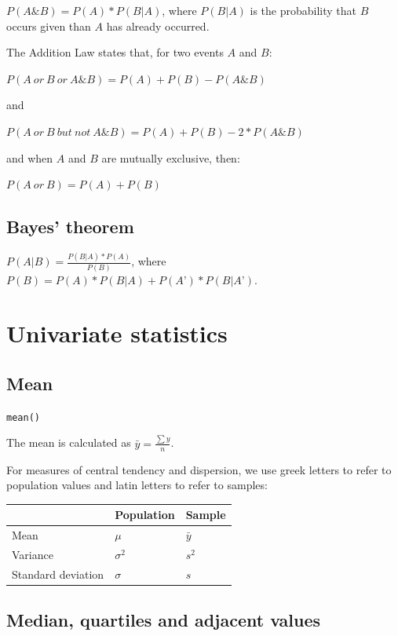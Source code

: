 \documentclass[
  11pt,
  a4paper,
]{book}
\begin{document}
\(P(A \& B) = P(A) * P(B|A)\), where \(P(B|A)\) is the probability that \(B\) occurs given than \(A\) has already occurred.

The Addition Law states that, for two events \(A\) and \(B\):

\(P(A\ or\ B\ or\ A\&B) = P(A) + P(B) - P(A\&B)\)

and

\(P(A\ or\ B\ but\ not\ A\&B) = P(A) + P(B) - 2*P(A\&B)\)

and when \(A\) and \(B\) are mutually exclusive, then:

\(P(A\ or\ B) = P(A) + P(B)\)

\hypertarget{bayes-theorem}{%
\subsection{Bayes' theorem}\label{bayes-theorem}}

\(P(A|B)= \frac{P(B|A) * P(A)}{P(B)}\), where \(P(B)= P(A) * P(B|A) + P(A’) * P(B|A’)\).

\hypertarget{univariate-statistics}{%
\section{Univariate statistics}\label{univariate-statistics}}

\hypertarget{mean}{%
\subsection{Mean}\label{mean}}

\texttt{mean()}

The mean is calculated as \(\bar{y} = \frac{\sum{y}}{n}\).

For measures of central tendency and dispersion, we use greek letters to refer to population values and latin letters to refer to samples:

\begin{longtable}[]{@{}lll@{}}
\toprule()
& Population & Sample \\
\midrule()
\endhead
Mean & \(\mu\) & \(\bar{y}\) \\
Variance & \(\sigma^2\) & \(s^2\) \\
Standard deviation & \(\sigma\) & \(s\) \\
\bottomrule()
\end{longtable}

\hypertarget{median-quartiles-and-adjacent-values}{%
\subsection{Median, quartiles and adjacent values}\label{median-quartiles-and-adjacent-values}}
\end{document}
